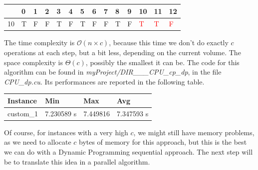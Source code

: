 \documentclass[12pt]{extarticle}
\begin{document}
\begin{center}
\begin{tabular}{| m{0.6cm} | m{0.6cm}| m{0.6cm} | m{0.6cm} | m{0.6cm} | m{0.6cm} | m{0.6cm} | m{0.6cm} | m{0.6cm}| m{0.6cm} | m{0.6cm} | m{0.6cm} | m{0.6cm} | m{0.6cm} |}
 \hline
 & 0 & 1 & 2 & 3 & 4 & 5 & 6 & 7 & 8 & 9 & 10 & 11 & 12\\
 \hline
10 & T & F & F & T & F & T & F & F & T & F & \textcolor{red}{T} & \textcolor{red}{T} & \textcolor{red}{F}\\
\hline
\end{tabular}
\end{center}
The time complexity is $\mathcal{O}(n \times c)$, because this time we don't do exactly $c$ operations at each step, but a bit less, depending on the current volume. The space complexity is $\Theta(c)$, possibly the smallest it can be.\newline
The code for this algorithm can be found in \emph{myProject/DIR\_\_\_CPU\_cp\_dp}, in the file \emph{CPU\_dp.cu}.\newline
Its performances are reported in the following table.
\begin{center}
\begin{tabular}{ | m{2.2cm} | m{2.2cm} | m{2.2cm} | m{2.2cm} |}
 \hline
 Instance & Min & Max & Avg\\
 \hline
 custom\_1 & 7.230589 s & 7.449816 & 7.347593 s\\
 \hline
\end{tabular}
\end{center}
Of course, for instances with a very high $c$, we might still have memory problems, as we need to allocate $c$ bytes of memory for this approach, but this is the best we can do with a Dynamic Programming sequential approach. The next step will be to translate this idea in a parallel algorithm.
\end{document}
